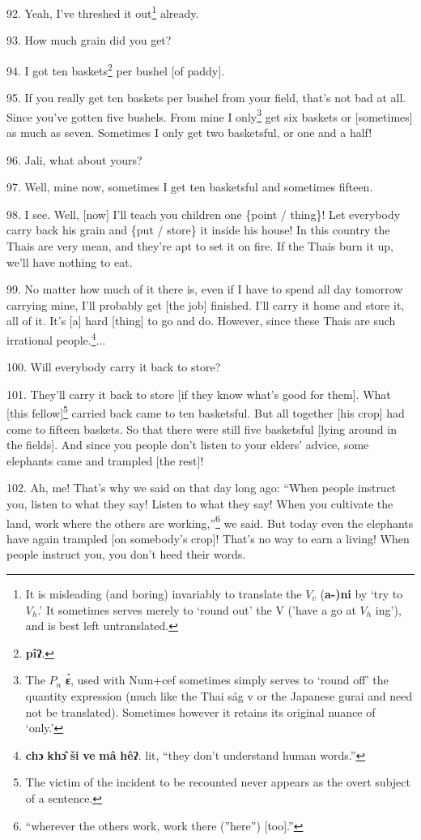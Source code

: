 92. Yeah, I've threshed it out\footnote{It is misleading (and boring) invariably to translate the $V_v$ (\textbf{a-)ni} by `try to $V_h$.' It sometimes serves merely to `round out' the V ('have a go at $V_h$ ing'), and is best left untranslated.} already.

93. How much grain did you get?

94. I got ten baskets\footnote{\textbf{pîʔ}.} per bushel [of paddy].

95. If you really get ten baskets per bushel from your field, that's not bad at
all. Since you've gotten five bushels. From mine I only\footnote{The $P_n$ \textbf{ɛ̀}, used with Num+cef sometimes simply serves to `round off' the quantity expression (much like the Thai ság v or the Japanese gurai and need not be translated). Sometimes however it retains its original nuance of `only.'} get six baskets or
[sometimes] as much as seven. Sometimes I only get two basketsful, or one and a
half!

96. Jali, what about yours?

97. Well, mine now, sometimes I get ten basketsful and sometimes fifteen.

98. I see. Well, [now] I'll teach you children one \{point / thing\}! Let everybody
carry back his grain and \{put / store\} it inside his house! In this country the
Thais are very mean, and they're apt to set it on fire. If the Thais burn it up,
we'll have nothing to eat.

99. No matter how much of it there is, even if I have to spend all day tomorrow
carrying mine, I'll probably get [the job] finished. I'll carry it home and store
it, all of it. It's [a] hard [thing] to go and do. However, since these Thais are
such irrational people.\footnote{\textbf{chɔ} \textbf{khɔ̂} \textbf{ši} \textbf{ve} \textbf{mâ} \textbf{hêʔ}. lit, ``they don't understand human words.''}...

100. Will everybody carry it back to store?

101. They'll carry it back to store [if they know what's good for them]. What [this
fellow]\footnote{The victim of the incident to be recounted never appears as the overt subject of a sentence.} carried back came to ten basketsful. But all together [his
crop] had come to fifteen baskets. So that there were still five basketsful [lying
around in the fields]. And since you people don't listen to your elders' advice,
some elephants came and trampled [the rest]!

102. Ah, me! That's why we said on that day long ago: ``When people instruct
you, listen to what they say! Listen to what they say! When you cultivate the land,
work where the others are working,''\footnote{``wherever the others work, work there (''here'') [too].''} we said. But today even the elephants
have again trampled [on somebody's crop]! That's no way to earn a living! When
people instruct you, you don't heed their words.

